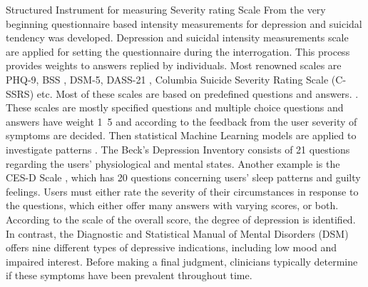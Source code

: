 \documentclass[12pt, letterpaper]{article}
\begin{document}
Structured Instrument for measuring Severity rating Scale 
From the very beginning questionnaire based intensity measurements for depression and suicidal tendency was developed. Depression and suicidal intensity measurements scale are applied for setting the questionnaire during the interrogation. This process provides weights to answers replied by individuals. Most renowned scales are PHQ-9, BSS \cite{beck2000weisman}, DSM-5, DASS-21 \cite{havigerova2019text}, Columbia Suicide Severity Rating Scale (C-SSRS) \cite{posner2011columbia, joiner1997modified} etc.  Most of these scales are based on predefined questions and answers. \cite{havigerova2019text, beck1961inventory, kroenke2001phq, tolentino2018dsm, kliem2017german, eke2010hamilton}. These scales are mostly specified questions and multiple choice questions and answers have weight 1~5 and according to the feedback from the user severity of symptoms are decided. Then statistical Machine Learning models are applied to investigate patterns \cite{shen2020detecting}. \cite{shen2017depression} The Beck's Depression Inventory \cite{beck2000weisman} consists of 21 questions regarding the users' physiological and mental states. Another example is the CES-D Scale \cite{radloff1977ces}, which has 20 questions concerning users' sleep patterns and guilty feelings. Users must either rate the severity of their circumstances in response to the questions, which either offer many answers with varying scores, or both. According to the scale of the overall score, the degree of depression is identified. In contrast, the Diagnostic and Statistical Manual of Mental Disorders (DSM) \cite{whooley2014diagnostic} offers nine different types of depressive indications, including low mood and impaired interest. Before making a final judgment, clinicians typically determine if these symptoms have been prevalent throughout time.
\end{document}

